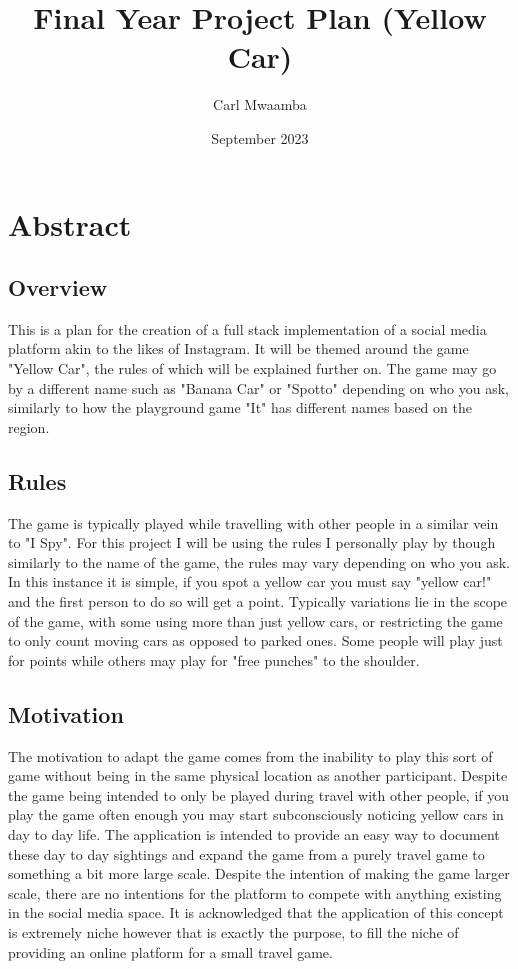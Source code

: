 \documentclass{article}
\title{Final Year Project Plan (Yellow Car)}
\author{Carl Mwaamba}
\date{September 2023}
\begin{document}
\maketitle

\section{Abstract}

\subsection{Overview}
This is a plan for the creation of a full stack implementation of a social media platform akin to the likes of Instagram. It will be themed around the game "Yellow Car", the rules of which will be explained further on. The game may go by a different name such as "Banana Car" or "Spotto" depending on who you ask, similarly to how the playground game "It" has different names based on the region.

\subsection{Rules}
The game is typically played while travelling with other people in a similar vein to "I Spy". For this project I will be using the rules I personally play by though similarly to the name of the game, the rules may vary depending on who you ask. In this instance it is simple, if you spot a yellow car you must say "yellow car!" and the first person to do so will get a point. Typically variations lie in the scope of the game, with some using more than just yellow cars, or restricting the game to only count moving cars as opposed to parked ones. Some people will play just for points while others may play for "free punches" to the shoulder.

\subsection{Motivation}
The motivation to adapt the game comes from the inability to play this sort of game without being in the same physical location as another participant. Despite the game being intended to only be played during travel with other people, if you play the game often enough you may start subconsciously noticing yellow cars in day to day life. The application is intended to provide an easy way to document these day to day sightings and expand the game from a purely travel game to something a bit more large scale. Despite the intention of making the game larger scale, there are no intentions for the platform to compete with anything existing in the social media space. It is acknowledged that the application of this concept is extremely niche however that is exactly the purpose, to fill the niche of providing an online platform for a small travel game.
\end{document}
